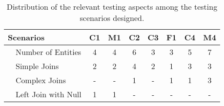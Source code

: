 \begin{table}[tb]
    \caption{Distribution of the relevant testing aspects among the testing scenarios designed.}
	\label{tab:scenarios_complexity}
    \begin{tabular}{|l|l|c|c|c|c|c|c|c|}
        \hline
        \multicolumn{2}{|l|}{\textbf{Scenarios}}                                                                                                                                                          & \multicolumn{1}{l|}{\textbf{C1}}           & \multicolumn{1}{l|}{\textbf{M1}} & \multicolumn{1}{l|}{\textbf{C2}}           & \multicolumn{1}{l|}{\textbf{C3}}           & \multicolumn{1}{l|}{\textbf{F1}} & \multicolumn{1}{l|}{\textbf{C4}}           & \multicolumn{1}{l|}{\textbf{M4}} \\ \hline
                                                                                                                               & Number of Entities                                                       & 4                                          & 4                                & 6                                          & 3                                          & 3                                & 5                                          & 7                                \\ \cline{2-9} 
                                                                                                                               & Simple Joins                                                             & 2                                          & 2                                & 4                                          & 2                                          & 1                                & 3                                          & 3                                \\ \cline{2-9} 
                                                                                                                               & Complex Joins                                                            & -                                          & -                                & 1                                          & -                                          & 1                                & 1                                          & 3                                \\ \cline{2-9} 
                                                                                                                               & Left Join with Null                                                      & 1                                          & 1                                & -                                          & -                                          & -                                & -                                          & -                                \\ \cline{2-9} 

\end{tabular}
\end{table}

